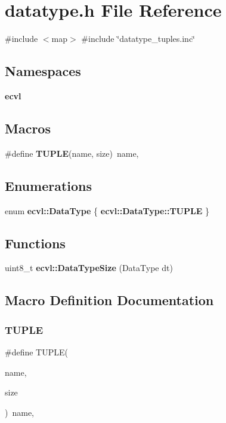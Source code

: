 \section{datatype.\+h File Reference}
\label{datatype_8h}
{\ttfamily \#include $<$map$>$}\newline
{\ttfamily \#include \char`\"{}datatype\+\_\+tuples.\+inc\char`\"{}}\newline
\subsection*{Namespaces}
\begin{DoxyCompactItemize}
\item 
 \textbf{ ecvl}
\end{DoxyCompactItemize}
\subsection*{Macros}
\begin{DoxyCompactItemize}
\item 
\#define \textbf{ T\+U\+P\+LE}(name,  size)~name,
\end{DoxyCompactItemize}
\subsection*{Enumerations}
\begin{DoxyCompactItemize}
\item 
enum \textbf{ ecvl\+::\+Data\+Type} \{ \textbf{ ecvl\+::\+Data\+Type\+::\+T\+U\+P\+LE}
 \}
\end{DoxyCompactItemize}
\subsection*{Functions}
\begin{DoxyCompactItemize}
\item 
uint8\+\_\+t \textbf{ ecvl\+::\+Data\+Type\+Size} (Data\+Type dt)
\end{DoxyCompactItemize}


\subsection{Macro Definition Documentation}
\mbox{\label{datatype_8h_a53188e9f90fa65ea3cfdd52151b550cc}} 
\subsubsection{TUPLE}
{\footnotesize\ttfamily \#define T\+U\+P\+LE(\begin{DoxyParamCaption}\item[{}]{name,  }\item[{}]{size }\end{DoxyParamCaption})~name,}

